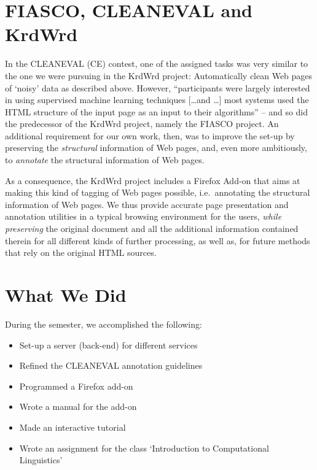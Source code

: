 \documentclass[12pt]{article}
\begin{document}
\section{FIASCO, CLEANEVAL and KrdWrd}

In the CLEANEVAL (CE) contest, one of the assigned tasks was very similar to the one we were pursuing in the KrdWrd project: Automatically clean Web pages of `noisy' data as described above. However, ``participants were largely interested in using supervised machine learning techniques [\ldots and \ldots] most systems used the HTML structure of the input page as an input to their algorithms'' \cite{BaroniChantreeKilgarriffSharoff2008} -- and so did the predecessor of the KrdWrd project, namely the FIASCO project\cite{FIASCO2007}. An additional requirement for our own work, then, was to improve the set-up by preserving the \textit{structural} information of Web pages, and, even more ambitiously, to \textit{annotate} the structural information of Web pages.

As a consequence, the KrdWrd project includes a Firefox Add-on that aims at making this kind of tagging of Web pages possible, i.e.~annotating the structural information of Web pages. We thus provide accurate page presentation and annotation utilities in a typical browsing environment for the users, \textit{while preserving} the original document and all the additional information contained therein for all different kinds of further processing, as well as, for future methods that rely on the original HTML sources.


\section{What We Did}

During the semester, we accomplished the following:

\begin{itemize}
	\item Set-up a server (back-end) for different services
	\item Refined the CLEANEVAL annotation guidelines
	\item Programmed a Firefox add-on
	\item Wrote a manual for the add-on
	\item Made an interactive tutorial
	\item Wrote an assignment for the class `Introduction to Computational Linguistics'
\end{itemize}
\end{document}
